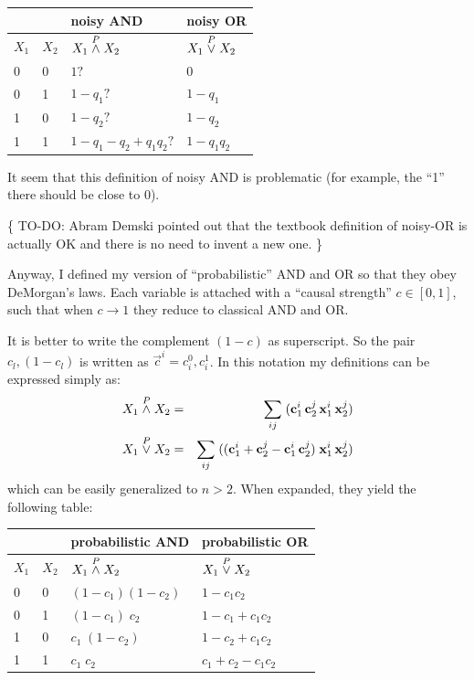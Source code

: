 \hspace*{1cm} \begin{tabular}{|l|l||l||l|} \hline
\multicolumn{2}{|c||}{} & {\textbf{noisy AND}}           & {\textbf{noisy OR}}\\ \hline
$X_1$ & $X_2$           & $X_1 \stackrel{P}{\wedge} X_2$          & $ X_1 \stackrel{P}{\vee} X_2 $\\ \hline
0     & 0               & $ 1 ? $                        & $ 0 $\\
0     & 1               & $ 1 - q_1 ? $                  & $ 1 - q_1 $\\
1     & 0               & $ 1 - q_2 ? $                  & $ 1 - q_2 $\\
1     & 1               & $ 1 - q_1 - q_2 + q_1 q_2 ? $  & $ 1 - q_1 q_2 $\\ \hline
\end{tabular}

It seem that this definition of noisy AND is problematic (for example, the ``1'' there should be close to 0).

\{ TO-DO:  Abram Demski pointed out that the textbook definition of noisy-OR is actually OK and there is no need to invent a new one. \}

Anyway, I defined my version of ``probabilistic'' AND and OR so that they obey DeMorgan's laws.  Each variable is attached with a ``causal strength'' $c \in [0,1]$, such that when $c \rightarrow 1$ they reduce to classical AND and OR.

It is better to write the complement $(1 - c)$ as superscript.  So the pair $c_l, (1 - c_l)$ is written as $\vec{c}^i = c_i^0, c_i^1$.  In this notation my definitions can be expressed simply as:
\begin{eqnarray}
 X_1 \stackrel{P}{\wedge} X_2 & = & \sum_{i j} \; ( \mathbf{c}^i_1 \, \mathbf{c}^j_2 \, \mathbf{x}^i_1 \, \mathbf{x}^j_2 ) \\
 X_1 \stackrel{P}{\vee}  X_2 & = & \sum_{i j} \; ( ( \mathbf{c}^i_1 + \mathbf{c}^j_2 - \mathbf{c}^i_1 \, \mathbf{c}^j_2 ) \; \mathbf{x}^i_1 \, \mathbf{x}^j_2 )
\end{eqnarray}
which can be easily generalized to $n > 2$.  When expanded, they yield the following table:

\hspace*{1cm} \begin{tabular}{|l|l||l||l|}
\hline
\multicolumn{2}{|c||}{} & {\textbf{probabilistic AND}} & {\textbf{probabilistic OR}}\\
\hline
$X_1$ & $X_2$ & $X_1 \stackrel{P}{\wedge} X_2$          & $X_1 \stackrel{P}{\vee} X_2$\\ \hline
0     & 0     & $(1-c_1) (1-c_2)$        & $1 - c_1 c_2$\\
0     & 1     & $(1-c_1) \; c_2$         & $1 - c_1 + c_1 c_2$\\
1     & 0     & $c_1 \; (1-c_2)$         & $1 - c_2 + c_1 c_2$\\
1     & 1     & $c_1 \; c_2$             & $c_1 + c_2 - c_1 c_2$\\
\hline
\end{tabular}
\parbox{8cm}{\begin{equation}
\label{eqn:probabilistic-AND-OR}
\end{equation}}

